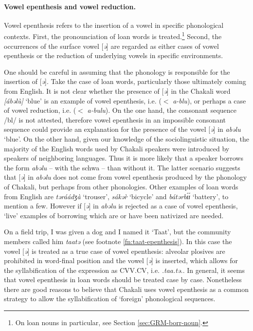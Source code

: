 \paragraph{Vowel epenthesis and vowel reduction.}
\label{sec:epenthesis}


Vowel epenthesis refers to the insertion of a vowel in specific phonological
contexts. First,  the pronounciation of loan words is treated.\footnote{On  loan
nouns in particular, see Section \ref{sec:GRM-borr-noun}.}  Second,  the
occurrences of the surface vowel [\textit{ə}] are regarded as  either cases of 
vowel
epenthesis or the reduction of  underlying vowels in specific environments. 


One should be careful in assuming that  the  phonology   is responsible for
the insertion of  [\textit{ə}].  Take the case of loan words,
particularly those ultimately coming  from  English. It is not clear whether the
presence of [\textit{ə}] in the Chakali
word {\it [ábəlù]}  `blue'  is an example of vowel epenthesis, i.e.  ($<$ 
{\it a-blu}),  or perhaps a case of vowel reduction, i.e.  ($<$ {\it a-bulu}).  
On the one hand, the 
consonant sequence  /bl/ is not attested, therefore  vowel
epenthesis 
in an impossible consonant sequence  could  provide an explanation for the
presence
of  the vowel [\textit{ə}] in {\it abəlu} `blue'.  On the other hand, given our 
knowledge
of the sociolinguistic situation,  the majority of the English words used by 
Chakali speakers   were introduced by speakers of neighboring languages. Thus it 
is more likely that a speaker borrows the form {\it abəlu} -- with the schwa --  
than without it. The latter scenario suggests that  [\textit{ə}] in {\it abəlu} 
does not come from vowel epenthesis produced by the phonology of Chakali, but 
perhaps from other phonologies.  Other examples of loan words from English are 
{\it təráádʒà} `trouser',  {\it sákər̀} `bicycle' and  {\it bátərbɪ́ɪ́} 
`battery', to mention a few. However if   [\textit{ə}]  in {\it abəlu} is 
rejected as a case of vowel epenthesis, `live' examples of borrowing  which are 
or have been nativized are needed.

On a field trip, I was given a dog  and I named it  `Taat', but the community 
members called him {\it taatə} (see footnote \ref{fn:taat-epenthesis}). In this 
case the  vowel  [\textit{ə}] is treated as a true case of vowel epenthesis: 
alveolar plosives are prohibited in word-final position and the   vowel  
[\textit{ə}] is  inserted, which allows for the syllabification of the 
expression as CVV.CV, i.e. {\it .taa.tə.}.  In general, it seems that vowel 
epenthesis in loan words should be treated case by case. Nonetheless there are 
good reasons to believe that Chakali uses vowel epenthesis as a common strategy 
to allow the syllabification of  `foreign' phonological sequences. 


